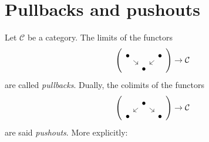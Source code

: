 \section{Pullbacks and pushouts}

Let \(\mathcal{C}\) be a category. The limits of the functors
\[
  \left(\begin{tikzcd}[sep=tiny]
      \bullet \ar[dr] &         & \bullet \ar[dl] \\
      & \bullet &
    \end{tikzcd}\right) \to \mathcal{C}
\]
are called {\em pullbacks}. Dually, the colimits of the functors
\[
  \left(\begin{tikzcd}[sep=tiny]
      & \bullet \ar[dl] \ar[dr] &         \\
      \bullet & & \bullet
    \end{tikzcd} \right) \to \mathcal{C}
\]
are said {\em pushouts}. More explicitly:


